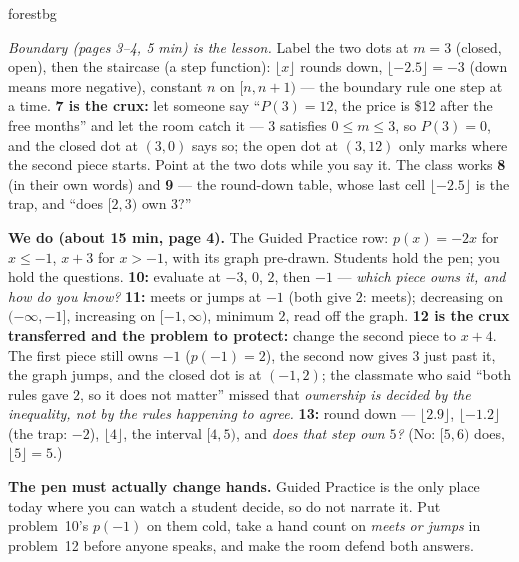 \documentclass[10pt]{article}
\begin{document}
\begin{skillbox}{forestbg}
\begin{multicols}{2}
\emph{Boundary (pages 3--4, 5 min) is the lesson.} Label the two dots at $m=3$ (closed, open),
then the staircase (a step function): $\lfloor x\rfloor$ rounds down, $\lfloor-2.5\rfloor=-3$
(down means more negative), constant $n$ on $[n,n+1)$ --- the boundary rule one step at a time.
\textbf{7 is the crux:} let someone say ``$P(3)=12$, the price is \$12 after the free months''
and let the room catch it --- $3$ satisfies $0\le m\le3$, so $P(3)=0$, and the closed dot at
$(3,0)$ says so; the open dot at $(3,12)$ only marks where the second piece starts. Point at the
two dots while you say it. The class works \textbf{8} (in their own words) and \textbf{9} ---
the round-down table, whose last cell $\lfloor-2.5\rfloor$ is the trap, and ``does $[2,3)$ own
$3$?''

\columnbreak
\textbf{We do (about 15 min, page 4).} The Guided Practice row: $p(x)=-2x$ for $x\le-1$, $x+3$
for $x>-1$, with its graph pre-drawn. Students hold the pen; you hold the questions.
\textbf{10:} evaluate at $-3$, $0$, $2$, then $-1$ --- \emph{which piece owns it, and how do you
know?} \textbf{11:} meets or jumps at $-1$ (both give $2$: meets); decreasing on
$(-\infty,-1]$, increasing on $[-1,\infty)$, minimum $2$, read off the graph. \textbf{12 is the
crux transferred and the problem to protect:} change the second piece to $x+4$. The first piece
still owns $-1$ ($p(-1)=2$), the second now gives $3$ just past it, the graph jumps, and the
closed dot is at $(-1,2)$; the classmate who said ``both rules gave $2$, so it does not matter''
missed that \emph{ownership is decided by the inequality, not by the rules happening to agree.}
\textbf{13:} round down --- $\lfloor2.9\rfloor$, $\lfloor-1.2\rfloor$ (the trap: $-2$),
$\lfloor4\rfloor$, the interval $[4,5)$, and \emph{does that step own $5$?} (No: $[5,6)$ does,
$\lfloor5\rfloor=5$.)

\textbf{The pen must actually change hands.} Guided Practice is the only place today where you
can watch a student decide, so do not narrate it. Put problem~10's $p(-1)$ on them cold, take a
hand count on \emph{meets or jumps} in problem~12 before anyone speaks, and make the room defend
both answers.


\end{multicols}
\end{skillbox}
\end{document}
